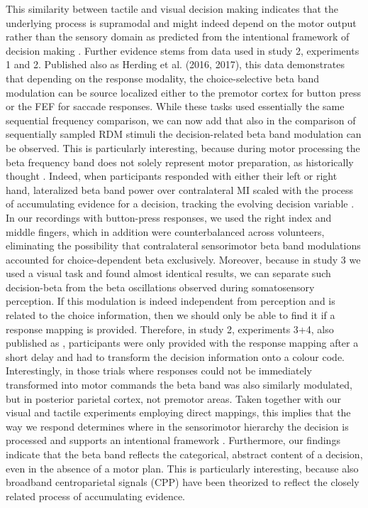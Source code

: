 This similarity between tactile and visual decision making indicates that the underlying process is supramodal and might indeed depend on the motor output rather than the sensory domain as predicted from the intentional framework of decision making \parencite{Shadlen2008}. Further evidence stems from data used in study 2, experiments 1 and 2. Published also as Herding et al. (2016, 2017),
 this data demonstrates that depending on the response modality, the choice-selective beta band modulation can be source localized either to the premotor cortex for button press or the FEF for saccade responses. While these tasks used essentially the same sequential frequency comparison, we can now add that also in the comparison of sequentially sampled RDM stimuli the decision-related beta band modulation can be observed. This is particularly interesting, because during motor processing the beta frequency band does not solely represent motor preparation, as historically thought \parencite{Pfurtscheller1981}. Indeed, when participants responded with either their left or right hand, lateralized beta band power over contralateral MI scaled with the process of accumulating evidence for a decision, tracking the evolving decision variable \parencite{Donner2009,OConnell2012}. In our recordings with button-press responses, we used the right index and middle fingers, which in addition were counterbalanced across volunteers, eliminating the possibility that contralateral sensorimotor beta band modulations accounted for choice-dependent beta exclusively. Moreover, because in study 3 we used a visual task and found almost identical results, we can separate such decision-beta from the beta oscillations observed during somatosensory perception. If this modulation is indeed independent from perception and is related to the choice information, then we should only be able to find it if a response mapping is provided. Therefore, in study 2, experiments 3+4, also published as \textcite{Ludwig2018}, participants were only provided with the response mapping after a short delay and had to transform the decision information onto a colour code. Interestingly, in those trials where responses could not be immediately transformed into motor commands the beta band was also similarly modulated, but in posterior parietal cortex, not premotor areas. Taken together with our visual and tactile experiments employing direct mappings, this implies that the way we respond determines where in the sensorimotor hierarchy the decision is processed and supports an intentional framework \parencite{Shadlen2008}. Furthermore, our findings indicate that the beta band reflects the categorical, abstract content of a decision, even in the absence of a motor plan. This is particularly interesting, because also broadband centroparietal signals (CPP) have been theorized to reflect the closely related process of accumulating evidence.

